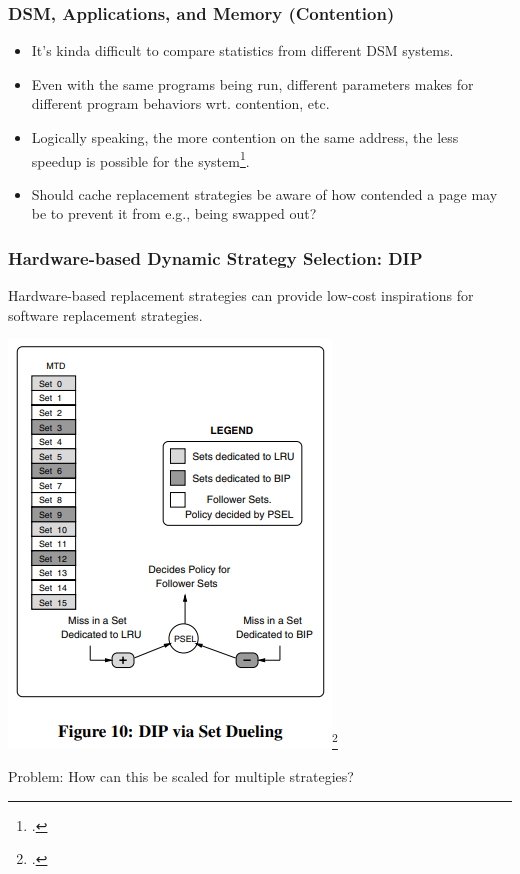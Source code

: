 \documentclass{beamer}
\begin{document}
\begin{frame}
    \frametitle{DSM, Applications, and Memory (Contention)}
    \begin{itemize}
        \item It's kinda difficult to compare statistics from different DSM systems.
        \item Even with the same programs being run, different parameters makes for different program behaviors wrt. contention, etc.
        \item Logically speaking, the more contention on the same address, the less speedup is possible for the system\footcite{de2000effect}.
        \item Should cache replacement strategies be aware of how contended a page may be to prevent it from e.g., being swapped out?
    \end{itemize}
\end{frame}

\begin{frame}
    \frametitle{Hardware-based Dynamic Strategy Selection: DIP}
    Hardware-based replacement strategies can provide low-cost inspirations for software replacement strategies.

    \includegraphics[height=0.6\textheight, center]{w4_slices_resources/DIP.Fig10.png}\footcite{QJPSE.2007.DIP}

    Problem: How can this be scaled for multiple strategies?
\end{frame}
\end{document}
